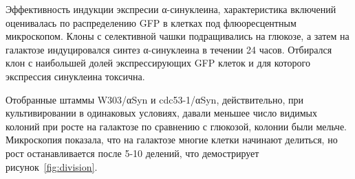 
Эффективность индукции экспресии α-синуклеина, характеристика включений оценивалась по распределению GFP в клетках под флюоресцентным микроскопом. Клоны с селективной чашки подращивались на глюкозе, а затем на галактозе индуцировался синтез α-синуклеина в течении 24 часов. Отбирался клон с наибольшей долей экспрессирующих GFP клеток и для которого экспрессия синуклеина токсична.



Отобранные штаммы W303/αSyn и cdc53-1/αSyn, действительно, при культивировании в одинаковых условиях, давали меньшее число видимых колоний при росте на галактозе по сравнению с глюкозой, колонии были мельче. %
Микроскопия показала, что на галактозе многие клетки начинают делиться, но рост останавливается после 5-10 делений, что демострирует рисунок~\ref{fig:division}.



